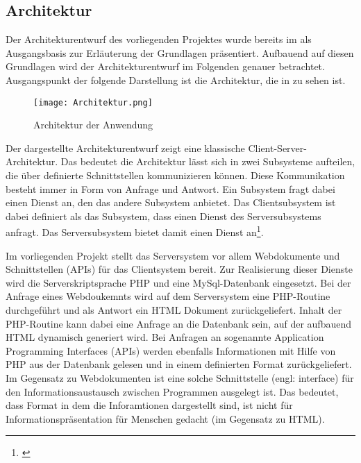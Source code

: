 \subsection{Architektur}
\label{sec:Architektur}

Der Architekturentwurf des vorliegenden Projektes wurde bereits im  als Ausgangsbasis zur Erläuterung der Grundlagen präsentiert. Aufbauend auf diesen Grundlagen wird der Architekturentwurf im Folgenden genauer betrachtet. Ausgangspunkt der folgende Darstellung ist die Architektur, die in  zu sehen ist.

\begin{figure}[htb]
\centering
\texttt{[image: Architektur.png]}
\caption[Architektur der Anwendung]{Architektur der
Anwendung\protect\footnotemark}
\label{fig:Architektur}
\end{figure}

Der dargestellte Architekturentwurf zeigt eine klassische Client-Server-Architektur. Das bedeutet die Architektur lässt sich in zwei Subsysteme aufteilen, die über definierte Schnittstellen kommunizieren können. Diese Kommunikation besteht immer in Form von Anfrage und Antwort. Ein Subsystem fragt dabei einen Dienst an, den das andere Subsystem anbietet. Das Clientsubsystem ist dabei definiert als das Subsystem, dass einen Dienst des Serversubsystems anfragt. Das Serversubsystem bietet damit einen Dienst an\footnote{\citet{rautenstrauch2002}}.

Im vorliegenden Projekt stellt das Serversystem vor allem Webdokumente und Schnittstellen (APIs) für das Clientsystem bereit. Zur Realisierung dieser Dienste wird die Serverskriptsprache PHP und eine MySql-Datenbank eingesetzt. Bei der Anfrage eines Webdoukemnts wird auf dem Serversystem eine PHP-Routine durchgeführt und als Antwort ein HTML Dokument zurückgeliefert. Inhalt der PHP-Routine kann dabei eine Anfrage an die Datenbank sein, auf der aufbauend HTML dynamisch generiert wird.
Bei Anfragen an sogenannte Application Programming Interfaces (APIs) werden ebenfalls Informationen mit Hilfe von PHP aus der Datenbank gelesen und in einem definierten Format zurückgeliefert. Im Gegensatz zu Webdokumenten ist eine solche Schnittstelle (engl: interface) für den Informationsaustausch zwischen Programmen ausgelegt ist. Das bedeutet, dass Format in dem die Inforamtionen dargestellt sind, ist nicht für Informationspräsentation für Menschen gedacht (im Gegensatz zu HTML).


